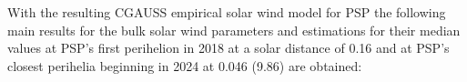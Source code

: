 
With the resulting CGAUSS empirical solar wind model for PSP the following main results for the bulk solar wind parameters and estimations for their median values at PSP’s first perihelion in 2018 at a solar distance of \SI{0.16}{\au} and at PSP’s closest perihelia beginning in 2024 at \SI{0.046}{\au} (\SI{9.86}{\Rs}) are obtained:
